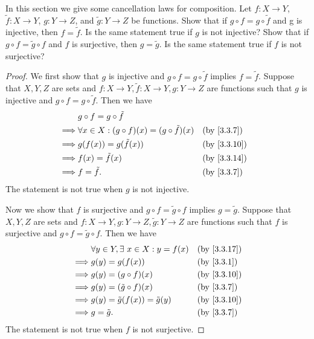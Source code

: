 \begin{ex}\label{ex:3.3.4}
  In this section we give some cancellation laws for composition.
  Let \(f : X \to Y\), \(\tilde{f} : X \to Y\), \(g : Y \to Z\), and \(\tilde{g} : Y \to Z\) be functions.
  Show that if \(g \circ f = g \circ \tilde{f}\) and g is injective, then \(f = \tilde{f}\).
  Is the same statement true if \(g\) is not injective?
  Show that if \(g \circ f = \tilde{g} \circ f\) and \(f\) is surjective, then \(g = \tilde{g}\).
  Is the same statement true if \(f\) is not surjective?
\end{ex}

\begin{proof}
  We first show that \(g\) is injective and \(g \circ f = g \circ \tilde{f}\) implies \(f = \tilde{f}\).
  Suppose that \(X, Y, Z\) are sets and \(f : X \to Y, \tilde{f} : X \to Y, g : Y \to Z\) are functions such that \(g\) is injective and \(g \circ f = g \circ \tilde{f}\).
  Then we have
  \begin{align*}
             & g \circ f = g \circ \tilde{f}                                                            \\
    \implies & \forall x \in X : (g \circ f)(x) = (g \circ \tilde{f})(x) &  & \text{(by \cref{3.3.7})}  \\
    \implies & g(f(x)) = g(\tilde{f}(x))                                 &  & \text{(by \cref{3.3.10})} \\
    \implies & f(x) = \tilde{f}(x)                                       &  & \text{(by \cref{3.3.14})} \\
    \implies & f = \tilde{f}.                                            &  & \text{(by \cref{3.3.7})}
  \end{align*}
  The statement is not true when \(g\) is not injective.

  Now we show that \(f\) is surjective and \(g \circ f = \tilde{g} \circ f\) implies \(g = \tilde{g}\).
  Suppose that \(X, Y, Z\) are sets and \(f : X \to Y, g : Y \to Z, \tilde{g} : Y \to Z\) are functions such that \(f\) is surjective and \(g \circ f = \tilde{g} \circ f\).
  Then we have
  \begin{align*}
             & \forall y \in Y, \exists\ x \in X : y = f(x) &  & \text{(by \cref{3.3.17})} \\
    \implies & g(y) = g(f(x))                               &  & \text{(by \cref{3.3.1})}  \\
    \implies & g(y) = (g \circ f)(x)                        &  & \text{(by \cref{3.3.10})} \\
    \implies & g(y) = (\tilde{g} \circ f)(x)                &  & \text{(by \cref{3.3.7})}  \\
    \implies & g(y) = \tilde{g}(f(x)) = \tilde{g}(y)        &  & \text{(by \cref{3.3.10})} \\
    \implies & g = \tilde{g}.                               &  & \text{(by \cref{3.3.7})}
  \end{align*}
  The statement is not true when \(f\) is not surjective.
\end{proof}

